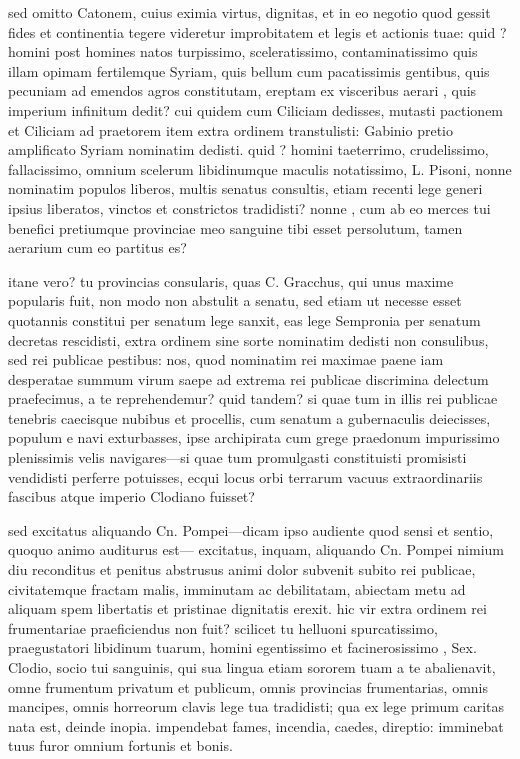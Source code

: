  sed omitto Catonem, cuius eximia virtus, dignitas, et in eo negotio quod gessit fides et continentia tegere videretur improbitatem et legis et actionis tuae: quid ? homini post homines natos turpissimo, sceleratissimo, contaminatissimo quis illam opimam fertilemque Syriam, quis bellum cum pacatissimis gentibus, quis pecuniam ad emendos agros constitutam, ereptam ex visceribus aerari , quis imperium infinitum dedit? cui quidem cum Ciliciam dedisses, mutasti pactionem et Ciliciam ad praetorem item extra ordinem transtulisti: Gabinio pretio amplificato Syriam nominatim dedisti. quid ? homini taeterrimo, crudelissimo, fallacissimo, omnium scelerum libidinumque maculis notatissimo, L. Pisoni, nonne nominatim populos liberos, multis senatus consultis, etiam recenti lege generi ipsius liberatos, vinctos et constrictos tradidisti? nonne , cum ab eo merces tui benefici pretiumque provinciae meo sanguine tibi esset persolutum, tamen aerarium cum eo partitus es?

 itane vero? tu provincias consularis, quas C. Gracchus, qui unus maxime popularis fuit, non modo non abstulit a senatu, sed etiam ut necesse esset quotannis constitui per senatum lege sanxit, eas lege Sempronia per senatum decretas rescidisti, extra ordinem sine sorte nominatim dedisti non consulibus, sed rei publicae pestibus: nos, quod nominatim rei maximae paene iam desperatae summum virum saepe ad extrema rei publicae discrimina delectum praefecimus, a te reprehendemur? quid tandem? si quae tum in illis rei publicae tenebris caecisque nubibus et procellis, cum senatum a gubernaculis deiecisses, populum e navi exturbasses, ipse archipirata cum grege praedonum impurissimo plenissimis velis navigares—si quae tum promulgasti constituisti promisisti vendidisti perferre potuisses, ecqui locus orbi terrarum vacuus extraordinariis fascibus atque imperio Clodiano fuisset?

 sed excitatus aliquando Cn. Pompei—dicam ipso audiente quod sensi et sentio, quoquo animo auditurus est— excitatus, inquam, aliquando Cn. Pompei nimium diu reconditus et penitus abstrusus animi dolor subvenit subito rei publicae, civitatemque fractam malis, imminutam ac debilitatam, abiectam metu ad aliquam spem libertatis et pristinae dignitatis erexit. hic vir extra ordinem rei frumentariae praeficiendus non fuit? scilicet tu helluoni spurcatissimo, praegustatori libidinum tuarum, homini egentissimo et facinerosissimo , Sex. Clodio, socio tui sanguinis, qui sua lingua etiam sororem tuam a te abalienavit, omne frumentum privatum et publicum, omnis provincias frumentarias, omnis mancipes, omnis horreorum clavis lege tua tradidisti; qua ex lege primum caritas nata est, deinde inopia. impendebat fames, incendia, caedes, direptio: imminebat tuus furor omnium fortunis et bonis.

